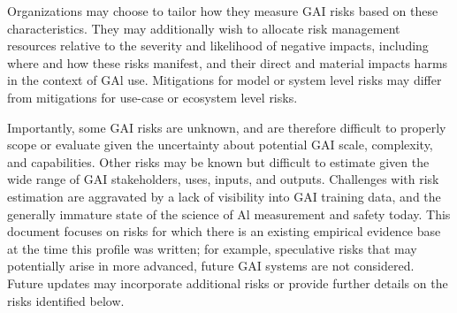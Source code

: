 \documentclass[10pt]{article}
\begin{document}
Organizations may choose to tailor how they measure GAI risks based on these characteristics. They may additionally wish to allocate risk management resources relative to the severity and likelihood of negative impacts, including where and how these risks manifest, and their direct and material impacts harms in the context of GAl use. Mitigations for model or system level risks may differ from mitigations for use-case or ecosystem level risks.

Importantly, some GAI risks are unknown, and are therefore difficult to properly scope or evaluate given the uncertainty about potential GAI scale, complexity, and capabilities. Other risks may be known but difficult to estimate given the wide range of GAI stakeholders, uses, inputs, and outputs. Challenges with risk estimation are aggravated by a lack of visibility into GAI training data, and the generally immature state of the science of Al measurement and safety today. This document focuses on risks for which there is an existing empirical evidence base at the time this profile was written; for example, speculative risks that may potentially arise in more advanced, future GAI systems are not considered. Future updates may incorporate additional risks or provide further details on the risks identified below.
\end{document}
